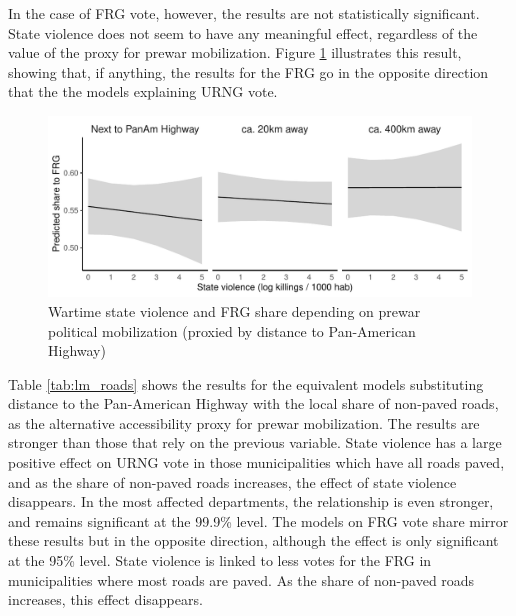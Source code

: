 \documentclass[12pt, notitlepage]{article}
\begin{document}
In the case of FRG vote, however, the results are not statistically significant.
State violence does not seem to have any meaningful effect, regardless of the value of the proxy for prewar mobilization.
Figure \ref{fig:pp_FRG_panam} illustrates this result, showing that, if anything, the results for the FRG go in the opposite direction that the the models explaining URNG vote.

\begin{figure}[htb!]
  \centering
    \includegraphics[width = .75\textwidth]{img/pp_FRG_panam}

  \caption{Wartime state violence and FRG share depending on prewar political mobilization (proxied by distance to Pan-American Highway)} \label{fig:pp_FRG_panam}


\end{figure}

Table \ref{tab:lm_roads} shows the results for the equivalent models substituting distance to the Pan-American Highway with the local share of non-paved roads, as the alternative accessibility proxy for prewar mobilization.
The results are stronger than those that rely on the previous variable.
State violence has a large positive effect on URNG vote in those municipalities which have all roads paved, and as the share of non-paved roads increases, the effect of state violence disappears.
In the most affected departments, the relationship is even stronger, and remains significant at the 99.9\% level.
The models on FRG vote share mirror these results but in the opposite direction, although the effect is only significant at the 95\% level.
State violence is linked to less votes for the FRG in municipalities where most roads are paved. As the share of non-paved roads increases, this effect disappears.
\end{document}

